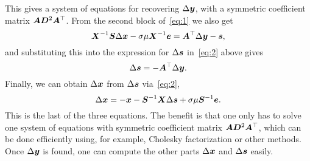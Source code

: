 \documentclass{article}
\begin{document}
This gives a system of equations for recovering $\Delta\bm{y}$, with a symmetric coefficient matrix $\bm{A}\bm{D}^2\bm{A}^{\top}$. From the second block of~\eqref{eq:1} we also get
\begin{equation*}
 \bm{X}^{-1}\bm{S}\Delta \bm{x}-\sigma \mu \bm{X}^{-1}\bm{e}=\bm{A}^{\top}\Delta \bm{y}-\bm{s},
\end{equation*}
and substituting this into the expression for $\Delta \bm{s}$ in~\eqref{eq:2} above gives
\begin{equation*}
 \Delta \bm{s} = -\bm{A}^{\top} \Delta \bm{y}.
\end{equation*}
Finally, we can obtain $\Delta\bm{x}$ from $\Delta\bm{s}$ via~\eqref{eq:2},
\begin{equation*}
 \Delta\bm{x} = -\bm{x}-\bm{S}^{-1}\bm{X}\Delta \bm{s}+\sigma \mu \bm{S}^{-1}\bm{e}.
\end{equation*}
This is the last of the three equations. The benefit is that one only has to solve one system of equations with symmetric coefficient matrix $\bm{A}\bm{D}^2\bm{A}^{\top}$, which can be done efficiently using, for example, Cholesky factorization or other methods. Once $\Delta\bm{y}$ is found, one can compute the other parts $\Delta\bm{x}$ and $\Delta\bm{s}$ easily.
\end{document}
